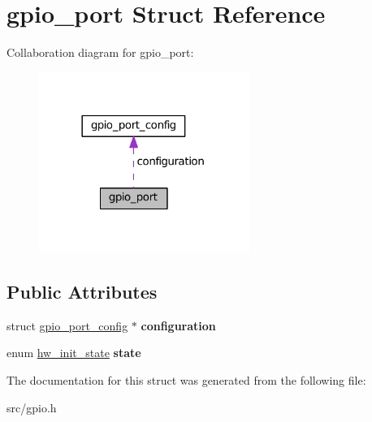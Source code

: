 \hypertarget{structgpio__port}{}\section{gpio\+\_\+port Struct Reference}
\label{structgpio__port}


Collaboration diagram for gpio\+\_\+port\+:\nopagebreak
\begin{figure}[H]
\begin{center}
\leavevmode
\includegraphics[width=194pt]{structgpio__port__coll__graph}
\end{center}
\end{figure}
\subsection*{Public Attributes}
\begin{DoxyCompactItemize}
\item 
\hypertarget{structgpio__port_ad67106287ff2c5d84c528b731374d5e8}{}struct \hyperlink{structgpio__port__config}{gpio\+\_\+port\+\_\+config} $\ast$ {\bfseries configuration}\label{structgpio__port_ad67106287ff2c5d84c528b731374d5e8}

\item 
\hypertarget{structgpio__port_acc0ba075ca33d19af55b06b16edd7ac6}{}enum \hyperlink{hw_8h_a3c02952100e7d051b77cdf060ca0ba9b}{hw\+\_\+init\+\_\+state} {\bfseries state}\label{structgpio__port_acc0ba075ca33d19af55b06b16edd7ac6}

\end{DoxyCompactItemize}


The documentation for this struct was generated from the following file\+:\begin{DoxyCompactItemize}
\item 
src/gpio.\+h\end{DoxyCompactItemize}
